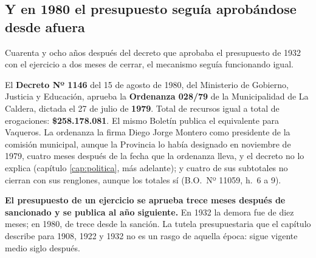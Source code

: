 \subsection*{Y en 1980 el presupuesto seguía aprobándose desde afuera}

Cuarenta y ocho años después del decreto que aprobaba el presupuesto de 1932 con el ejercicio
a dos meses de cerrar, el mecanismo seguía funcionando igual.

El \textbf{Decreto Nº 1146} del 15 de agosto de 1980, del Ministerio de Gobierno, Justicia y
Educación, aprueba la \textbf{Ordenanza 028/79} de la Municipalidad de La Caldera, dictada el
27 de julio de \textbf{1979}. Total de recursos igual a total de erogaciones:
\textbf{\$258.178.081}. El mismo Boletín publica el equivalente para Vaqueros. La ordenanza la firma Diego Jorge Montero como presidente de la comisión municipal, aunque la Provincia lo había designado en noviembre de 1979, cuatro meses después de la fecha que la ordenanza lleva, y el decreto no lo explica (capítulo \ref{cap:politica}, más adelante); y cuatro de sus subtotales no cierran con sus renglones, aunque los totales sí (B.O.\ Nº 11059, h.\ 6 a 9).

\textbf{El presupuesto de un ejercicio se aprueba trece meses después de sancionado y se
publica al año siguiente.} En 1932 la demora fue de diez meses; en 1980, de trece desde la sanción. La tutela
presupuestaria que el capítulo describe para 1908, 1922 y 1932 no es un rasgo de aquella
época: sigue vigente medio siglo después.

